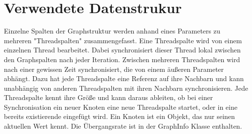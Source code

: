 \section{Verwendete Datenstrukur}
Einzelne Spalten der Graphstruktur werden anhand eines Parameters zu mehreren "Threadspalten" zusammengefasst. Eine Threadspalte wird von einem einzelnen Thread bearbeitet. Dabei synchronisiert dieser Thread lokal zwischen den Graphspalten nach jeder Iteration.
Zwischen mehreren Threadspalten wird nach einer gewissen Zeit synchronisiert, die von einem äußeren Parameter abhängt. Dazu hat jede Threadspalte eine Referenz auf ihre Nachbarn und kann unabhängig von anderen Threadspalten mit ihren Nachbarn synchronisieren.  
Jede Threadspalte kennt ihre Größe und kann daraus ableiten, ob bei einer Synchronisation ein neuer Knoten eine neue Threadspalte startet, oder in eine bereits existierende eingefügt wird. 
Ein Knoten ist ein Objekt, das nur seinen aktuellen Wert kennt. Die Übergangsrate ist in der GraphInfo Klasse enthalten. 


